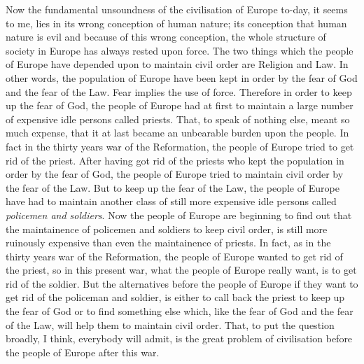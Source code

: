 Now the fundamental unsoundness of the civilisation of Europe to-day, it seems to me, lies in its wrong conception of human nature;
its conception that human nature is evil and because of this wrong conception, the whole structure of society in Europe has always rested upon force.
The two things which the people of Europe have depended upon to maintain civil order are Religion and Law.
In other words, the population of Europe have been kept in order by the fear of God and the fear of the Law.
Fear implies the use of force.
Therefore in order to keep up the fear of God,
the people of Europe had at first to maintain a large number of expensive idle persons called priests.
That, to speak of nothing else, meant so much expense, that it at last became an unbearable burden upon the people.
In fact in the thirty years war of the Reformation, the people of Europe tried to get rid of the priest.
After having got rid of the priests who kept the population in order by the fear of God, the people of Europe tried to maintain civil order by the fear of the Law.
But to keep up the fear of the Law, the people of Europe have had to maintain another class of still more expensive idle persons called \emph{policemen and soldiers}.
Now the people of Europe are beginning to find out that the maintainence of policemen and soldiers to keep civil order, is still more ruinously expensive than even the maintainence of priests.
In fact, as in the thirty years war of the Reformation, the people of Europe wanted to get rid of the priest,
so in this present war, what the people of Europe really want, is to get rid of the soldier.
But the alternatives before the people of Europe if they want to get rid of the policeman and soldier,
is either to call back the priest to keep up the fear of God or to find something else which,
like the fear of God and the fear of the Law,
will help them to maintain civil order. That, to put the question broadly,
I think, everybody will admit, is the great problem of civilisation before the people of Europe after this war.

